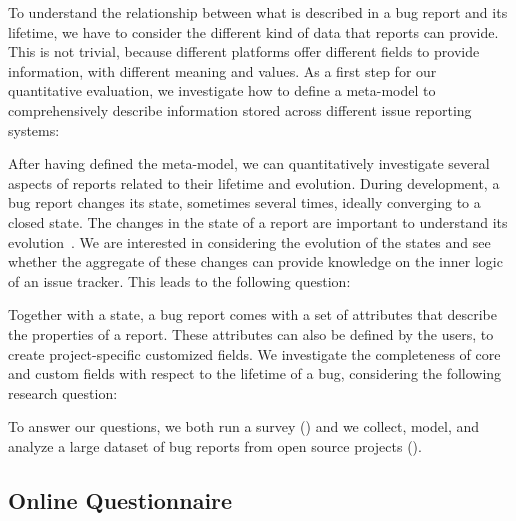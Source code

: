 
To understand the relationship between what is described in a bug report and its lifetime, we have to consider the different kind of data that reports can provide.
This is not trivial, because different platforms offer different fields to provide information, with different meaning and values.
As a first step for our quantitative evaluation, we investigate how to define a meta-model to comprehensively describe information stored across different issue reporting systems:


After having defined the meta-model, we can quantitatively investigate several aspects of reports related to their lifetime and evolution.
During development, a bug report changes its state, sometimes several times, ideally converging to a closed state.
The changes in the state of a report are important to understand its evolution~\cite{DAmb2007b}.
We are interested in considering the evolution of the states and see whether the aggregate of these changes can provide knowledge on the inner logic of an issue tracker.
This leads to the following question:


Together with a state, a bug report comes with a set of attributes that describe the properties of a report.
These attributes can also be defined by the users, to create project-specific customized fields.
We investigate the completeness of core and custom fields with respect to the lifetime of a bug, considering the following research question:


To answer our questions, we both run a survey () and we collect, model, and analyze a large dataset of bug reports from open source projects ().

\subsection{Online Questionnaire} \label{sec:model-survey}

